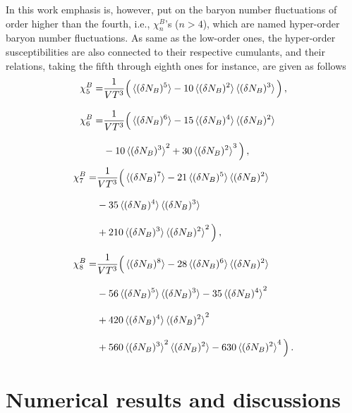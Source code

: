 \documentclass[%
reprint,
superscriptaddress,
showpacs,preprintnumbers,
 amsmath,amssymb,
 aps,
prd,
]{revtex4-1}
\begin{document}
In this work emphasis is, however, put on the baryon number fluctuations of order higher than the fourth, i.e., $\chi_n^{B}$'s ($n>4$), which are named hyper-order baryon number fluctuations. As same as the low-order ones, the hyper-order susceptibilities are also connected to their respective cumulants, and their relations, taking the fifth through eighth ones for instance, are given as follows
%
\begin{align}
\chi^B_5=&\frac{1}{VT^3}\Big(\braket{(\delta N_B)^5}-10\braket{(\delta N_B)^2}\braket{(\delta N_B)^3}\Big)\,,\\[2ex]
\chi^B_6=&\frac{1}{VT^3}\Big(\braket{(\delta N_B)^6}-15\braket{(\delta N_B)^4}\braket{(\delta N_B)^2}\nonumber\\[2ex]
&-10\braket{(\delta N_B)^3}^2+30\braket{(\delta N_B)^2}^3\Big)\,,
\end{align}
\begin{align}
\chi^B_7=&\frac{1}{VT^3}\Big(\braket{(\delta N_B)^7}-21\braket{(\delta N_B)^5}\braket{(\delta N_B)^2}\nonumber\\[2ex]
&-35\braket{(\delta N_B)^4}\braket{(\delta N_B)^3}\nonumber\\[2ex]
&+210\braket{(\delta N_B)^3}\braket{(\delta N_B)^2}^2\Big)\,,\\[2ex]
\chi^B_8=&\frac{1}{VT^3}\Big(\braket{(\delta N_B)^8}-28\braket{(\delta N_B)^6}\braket{(\delta N_B)^2}\nonumber\\[2ex]
&-56\braket{(\delta N_B)^5}\braket{(\delta N_B)^3}-35\braket{(\delta N_B)^4}^2\nonumber\\[2ex]
&+420\braket{(\delta N_B)^4}\braket{(\delta N_B)^2}^2\nonumber\\[2ex]
&+560\braket{(\delta N_B)^3}^2\braket{(\delta N_B)^2}-630\braket{(\delta N_B)^2}^4\Big)\,.
\end{align}
%


\section{Numerical results and discussions}
\label{sec:num}
\end{document}
